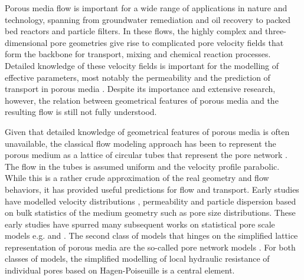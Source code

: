 \documentclass[draft]{agujournal2019}
\begin{document}
Porous media flow is important for a wide range of applications in nature and technology, spanning from groundwater remediation and oil recovery to packed bed reactors and particle filters. In these flows, the highly complex and three-dimensional pore geometries give rise to complicated pore velocity fields that form the backbone for transport, mixing and chemical reaction processes. Detailed knowledge of these velocity fields is important for the modelling of effective parameters, most notably the permeability and the prediction of transport in porous media \cite{bear_dynamics_1972,scheidegger_physics_1974}. Despite its importance and extensive research, however, the relation between geometrical features of porous media and the resulting flow is still not fully understood.


Given that detailed knowledge of geometrical features of porous media is often unavailable, the classical flow modeling approach has been to represent the porous medium as a lattice of circular tubes that represent the pore network \cite{scheidegger_physics_1974}. The flow in the tubes is assumed uniform and the velocity profile parabolic. While this is a rather crude approximation of the real geometry and flow behaviors, it has provided useful predictions for flow and transport. Early studies have modelled velocity distributions \cite{haring_statistical_1970}, permeability \cite{fatt_network_1956,katz_quantitative_1986} and particle dispersion \cite{saffman_theory_1959} based on bulk statistics of the medium geometry such as pore size distributions. These early studies have spurred many subsequent works on statistical pore scale models e.g.  and . The second class of models that hinges on the simplified lattice representation of porous media are the so-called pore network models \cite{thompson_modeling_1997}. For both classes of models, the simplified modelling of local hydraulic resistance of individual pores based on Hagen-Poiseuille is a central element.
\end{document}
